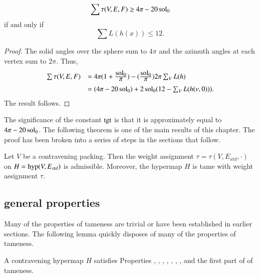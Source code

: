 \begin{lemma}
$$
\sum \tau (V,E,F) \ge 4\pi - 20\operatorname{sol}_0
$$
if and only if
$$
\sum L(h(x)) \le 12.
$$
\end{lemma}

\begin{proof}
The solid angles over the sphere sum to $4\pi$ and the azimuth angles at each vertex sum to $2\pi$. 
Thus,
\begin{equation}\label{eqn:delta0}
\begin{array}{lll}
\sum \tau (V,E,F) 
&= 4\pi (1 + \dfrac{\sol_0}{\pi}) - (\dfrac{\sol_0}{\pi}) 2\pi \sum_{V} L(h)\vspace{6pt}\\

&= (4\pi - 20\sol_0) + 2\sol_0 (12 - \sum_V L(h(v,\orz))).
\end{array}
\end{equation}
The result follows.
\end{proof}

The significance of the constant ${\operatorname{tgt}}$ is that it is approximately equal to $4\pi - 20\operatorname{sol}_0$.
%
The following theorem is one of the main results of this chapter.  The proof has been broken into
a series of steps in the sections that follow.

\begin{theorem} \label{theorem:contravene}
Let $V$ be a contravening  packing.  Then the weight assignment $\tau=\tau(V,E_{std},\cdot)$ on
$H={\operatorname{hyp}}(V,E_{std})$ is admissible.  Moreover, 
the hypermap $H$ is tame with weight assignment $\tau$.
\end{theorem}
%
%
%



\subsection{general properties}
    \label{sec:startame}


Many of the properties of tameness are trivial or have been established in earlier sections.
The following lemma quickly disposes of many of the properties of tameness.

\begin{lemma}\label{lemma:multi} %
A contravening hypermap $H$ satisfies Properties
, , , , , , 
, and the first part of 
of tameness.
\end{lemma}


